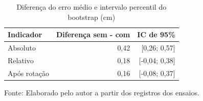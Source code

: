 \begin{table}[H]\centering
\caption{Diferença do erro médio e intervalo percentil do bootstrap (cm)}\label{tab:reanalise-bootstrap}
\small\begin{tabular}{lrr}\toprule
Indicador & Diferença sem - com & IC de 95\%\\\midrule
Absoluto & 0,42 & [0,26; 0,57]\\
Relativo & 0,18 & [-0,04; 0,38]\\
Após rotação & 0,16 & [-0,08; 0,37]\\
\bottomrule\end{tabular}\par\smallskip
{\footnotesize Fonte: Elaborado pelo autor a partir dos registros dos ensaios.}\end{table}
